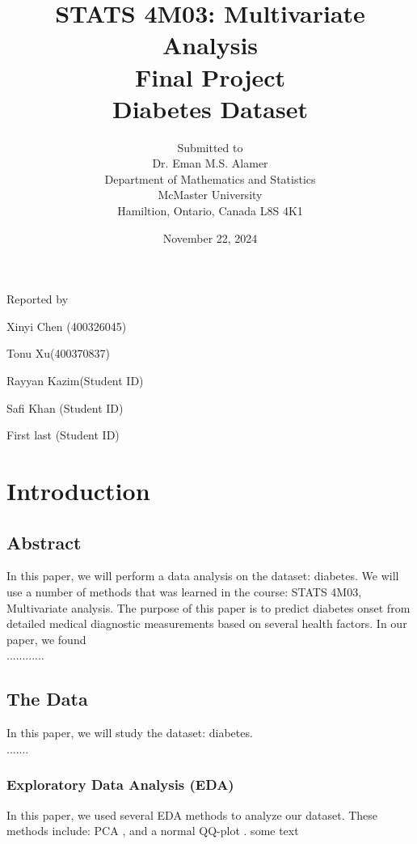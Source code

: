 \documentclass[12pt]{article}
\begin{document}
\title{STATS 4M03: Multivariate Analysis\\ Final Project \\ Diabetes Dataset }

\author{Submitted to\\ Dr. Eman M.S. Alamer 
\\Department of Mathematics and Statistics
\\McMaster University\\Hamiltion, Ontario, Canada L8S 4K1}
\date {November 22, 2024}


\maketitle

 \centerline{Reported by}
 \centerline{Xinyi Chen (400326045)}
  \centerline{Tonu Xu(400370837)}
   \centerline{Rayyan Kazim(Student ID)}
    \centerline{Safi Khan (Student ID)}
     \centerline{First last (Student ID)}


\newpage
\section{Introduction}
\subsection{Abstract}
In this paper, we will perform a data analysis on the dataset: diabetes. We will use a number of methods that was learned in the course: STATS 4M03, Multivariate analysis. The purpose of this paper is to predict diabetes onset from detailed medical diagnostic measurements based on several health factors. In our paper, we found\\

............
\subsection{The Data}

In this paper, we will study the dataset: diabetes. \cite{Kaggles}\\
.......
\subsubsection{Exploratory Data Analysis (EDA)}
In this paper, we used several EDA methods to analyze our dataset. These methods include: PCA \cite{kurita2019principal}, and a normal QQ-plot \cite{marden2004positions}. some text \cite{Lecture2}
\end{document}
